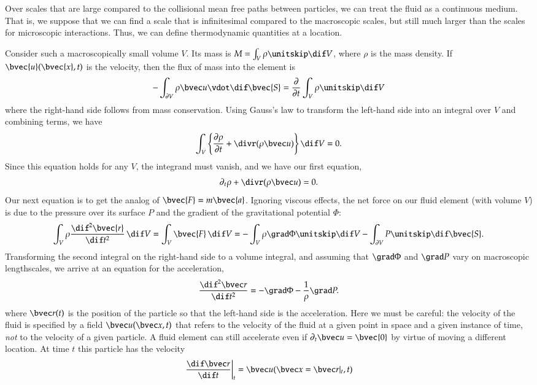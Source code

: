 Over scales that are large compared to the collisional mean free paths between particles, we can treat the fluid as a continuous medium.  That is, we suppose that we can find a scale that is infinitesimal compared to the macroscopic scales, but still much larger than the scales for microscopic interactions. Thus, we can define thermodynamic quantities at a location.

Consider such a macroscopically small volume $V$. Its mass is $M = \int_{V} \rho\nsp\dif V$, where $\rho$ is the mass density.  If $\bvec{u}(\bvec{x},t)$ is the velocity, then the flux of mass into the element is
\[
-\int_{\partial V}\rho\vu\vdot \dif \bvec{S} = \frac{\partial}{\partial t}\int_{V}\rho\nsp\dif V
\]
where the right-hand side follows from mass conservation.  Using Gauss's law to transform the left-hand side into an integral over $V$ and combining terms, we have
\[
\int_{V} \left\{ \frac{\partial\rho}{\partial t} + \divr(\rho\vu)\right\}\dif V = 0.
\]
Since this equation holds for any $V$, the integrand must vanish, and we have our first equation,
\begin{equation}\label{e.mass-conv}
\partial_{t}\rho + \divr(\rho\vu) = 0.
\end{equation}
Our next equation is to get the analog of $\bvec{F} = m\bvec{a}$.  Ignoring viscous effects, the net force on our fluid element (with volume $V$) is due to the pressure over its surface $P$ and the gradient of the gravitational potential $\Phi$:
\[
\int_{V}\rho \frac{\dif^{2}\bvec{r}}{\dif t^{2}}\,\dif V = \int_{V}\bvec{F}\,\dif V =  -\int_{V}\rho\grad\Phi\nsp\dif V - \int_{\partial V}P \nsp\dif \bvec{S}.
\]
Transforming the second integral on the right-hand side to a volume integral, and assuming that $\grad \Phi$ and $\grad P$ vary on macroscopic lengthscales, we arrive at an equation for the acceleration,
\begin{equation}\label{e.accel}
\frac{\dif^{2}\vr}{\dif t^{2}} = -\grad\Phi - \frac{1}{\rho}\grad P.
\end{equation}
where $\vr(t)$ is the position of the particle so that the left-hand side is the acceleration.
Here we must be careful: the velocity of the fluid is specified by a field $\vu(\vx,t)$ that refers to the velocity of the fluid at a given point in space and a given instance of time, \emph{not} to the velocity of a given particle.  A fluid element can still accelerate even if $\partial_{t}\vu = \bvec{0}$ by virtue of moving a different location. At time $t$ this particle has the velocity
\begin{equation}\label{e.rdot}
\left.\frac{\dif\vr}{\dif t}\right|_{t} = \vu(\vx = \vr|_{t},t)
\end{equation}
